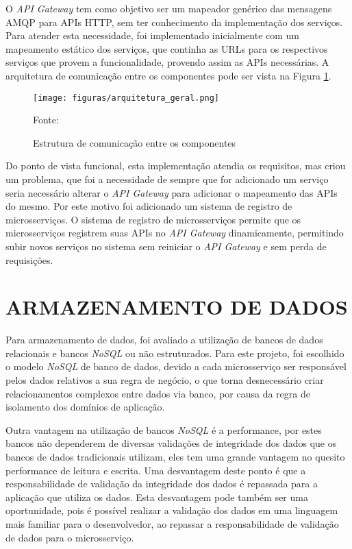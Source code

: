 O \emph{API Gateway} tem como objetivo ser um mapeador genérico das mensagens
\ac{AMQP} para \acp{API} \ac{HTTP}, sem ter conhecimento da implementação dos
serviços. Para atender esta necessidade, foi implementado inicialmente com um
mapeamento estático dos serviços, que continha as \acp{URL} para os respectivos
serviços que provem a funcionalidade, provendo assim as \acp{API} necessárias.
A arquitetura de comunicação entre os componentes pode ser vista na Figura
\ref{fig:arch-geral}.

\begin{figure}[H]
	\centering
	\caption{Estrutura de comunicação entre os componentes}
	\texttt{[image: figuras/arquitetura\_geral.png]}

    \label{fig:arch-geral}
	\footnotesize Fonte: \fonteOAutor
\end{figure}

Do ponto de vista funcional, esta implementação atendia os requisitos, mas
criou um problema, que foi a necessidade de sempre que for adicionado um
serviço seria necessário alterar o \emph{API Gateway} para adicionar o mapeamento
das \acp{API} do mesmo. Por este motivo foi adicionado um sistema de registro
de microsserviços. O sistema de registro de microsserviços permite que os
microsserviços registrem suas \acp{API} no \emph{API Gateway} dinamicamente,
permitindo subir novos serviços no sistema sem reiniciar o \emph{API Gateway}
e sem perda de requisições.

\section{ARMAZENAMENTO DE DADOS}

Para armazenamento de dados, foi avaliado a utilização de bancos de dados
relacionais e bancos \emph{NoSQL} ou não estruturados. Para este projeto, foi
escolhido o modelo \emph{NoSQL} de banco de dados, devido a cada microsserviço
ser responsável pelos dados relativos a sua regra de negócio, o que torna
desnecessário criar relacionamentos complexos entre dados via banco,
por causa da regra de isolamento dos domínios de aplicação.

Outra vantagem na utilização de bancos \emph{NoSQL} é a performance, por
estes bancos não dependerem de diversas validações de integridade dos dados
que os bancos de dados tradicionais utilizam, eles tem uma grande vantagem
no quesito performance de leitura e escrita. Uma desvantagem deste ponto é
que a responsabilidade de validação da integridade dos dados é repassada para
a aplicação que utiliza os dados. Esta desvantagem pode também ser uma
oportunidade, pois é possível realizar a validação dos dados em uma
linguagem mais familiar para o desenvolvedor, ao repassar a responsabilidade
de validação de dados para o microsserviço.

